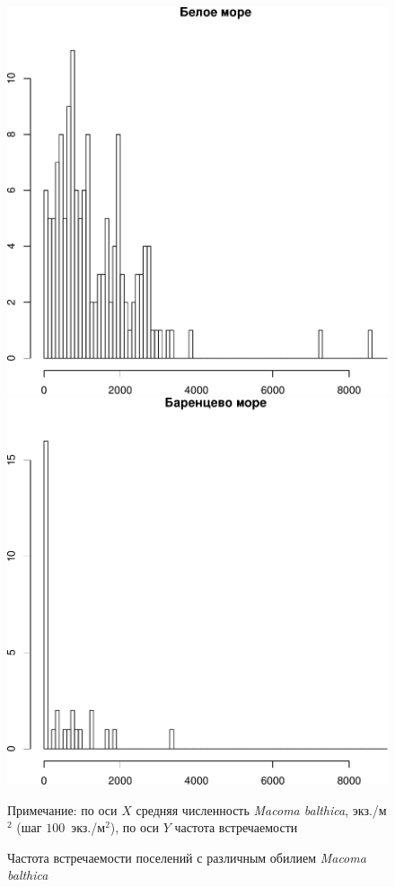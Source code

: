 \documentclass[12pt, a4paper]{disser}
\begin{document}
	\begin{figure}[h]
		\includegraphics[height=.3\textheight]{../All_N/Nmean_hist_White.pdf}
		\includegraphics[height=.3\textheight]{../All_N/Nmean_hist_Barents.pdf}
	\caption{Частота встречаемости поселений с различным обилием {\it Macoma balthica}}
	{\footnotesize Примечание: по оси $X$ \textemdash средняя численность {\it Macoma balthica}, экз./м$^2$ (шаг \textemdash $100$~экз./м$^2$), по оси $Y$ 	\textemdash частота встречаемости}
	\label{ris:Nmean_hist}
	\end{figure}
\end{document}
